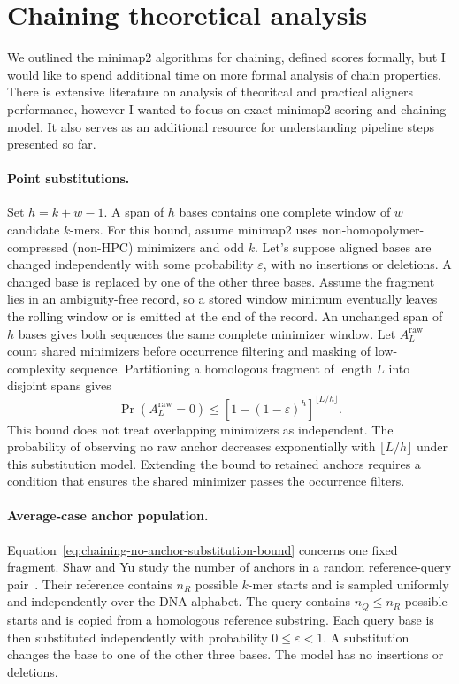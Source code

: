 
\section{Chaining theoretical analysis}
\label{sec:chaining-analysis-two}

We outlined the minimap2 algorithms for chaining, defined scores formally, but I would like to spend additional time on more formal analysis of chain properties.
There is extensive literature on analysis of theoritcal and practical aligners performance, however I wanted to focus on exact minimap2 scoring and chaining model. It also serves as an additional resource for understanding pipeline steps presented so far.

\paragraph{Point substitutions.}
Set \(h=k+w-1\). A span of \(h\) bases contains one complete window of \(w\)
candidate \(k\)-mers. For this bound, assume minimap2 uses
non-homopolymer-compressed (non-HPC) minimizers and odd \(k\). Let's suppose aligned
bases are changed independently with some 
probability \(\varepsilon\), with no insertions or deletions. A changed base is
replaced by one of the other three bases. Assume the fragment lies in an
ambiguity-free record, so a stored window minimum eventually leaves the
rolling window or is emitted at the end of the record. An unchanged span of
\(h\) bases gives both sequences the same complete minimizer window. Let
\(A_L^{\mathrm{raw}}\) count shared minimizers before occurrence filtering and
masking of low-complexity sequence. Partitioning a homologous fragment of length \(L\)
into disjoint spans gives
\begin{equation}
  \Pr\!\left(A_L^{\mathrm{raw}}=0\right)
  \leq
  \left[1-(1-\varepsilon)^h\right]^{\lfloor L/h\rfloor}.
  \label{eq:chaining-no-anchor-substitution-bound}
\end{equation}
This bound does not treat overlapping minimizers as independent. The
probability of observing no raw anchor decreases exponentially with
\(\lfloor L/h\rfloor\) under this substitution model. Extending the bound to
retained anchors requires a condition that ensures the shared minimizer passes
the occurrence filters.

\paragraph{Average-case anchor population.}
Equation~\ref{eq:chaining-no-anchor-substitution-bound} concerns one fixed
fragment. Shaw and Yu study the number of anchors in a random reference-query
pair~\cite{shaw_yu_seed_chain_extend_2023}. Their reference contains
\(n_R\) possible \(k\)-mer starts and is sampled uniformly and independently
over the DNA alphabet. The query contains \(n_Q\leq n_R\) possible starts and
is copied from a homologous reference substring. Each query base is then
substituted independently with probability \(0\leq\varepsilon<1\). A
substitution changes the base to one of the other three bases. The model has
no insertions or deletions.

